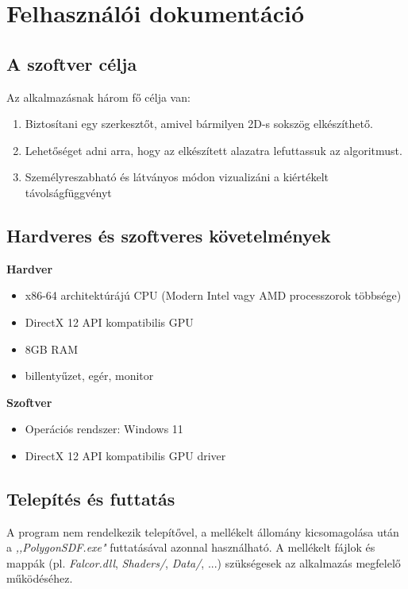\chapter{Felhasználói dokumentáció}
\label{ch:user}


\section{A szoftver célja}

Az alkalmazásnak három fő célja van:
\begin{enumerate}
    \item Biztosítani egy szerkesztőt, amivel bármilyen 2D-s sokszög elkészíthető.
    \item Lehetőséget adni arra, hogy az elkészített alazatra lefuttassuk az algoritmust.
    \item Személyreszabható és látványos módon vizualizáni a kiértékelt távolságfüggvényt
\end{enumerate}


\section{Hardveres és szoftveres követelmények}

\textbf{Hardver}
\begin{itemize}
    \item x86-64 architektúrájú CPU (Modern Intel vagy AMD processzorok többsége)
    \item DirectX 12 API kompatibilis GPU
    \item 8GB RAM
    \item billentyűzet, egér, monitor
\end{itemize}

\textbf{Szoftver}
\begin{itemize}
    \item Operációs rendszer: Windows 11
    \item DirectX 12 API kompatibilis GPU driver
\end{itemize}


\section{Telepítés és futtatás}

A program nem rendelkezik telepítővel, a mellékelt állomány kicsomagolása után a \textit{,,PolygonSDF.exe"} futtatásával azonnal használható. A mellékelt fájlok és mappák (pl. \textit{Falcor.dll}, \textit{Shaders/}, \textit{Data/}, ...) szükségesek az alkalmazás megfelelő működéséhez.


